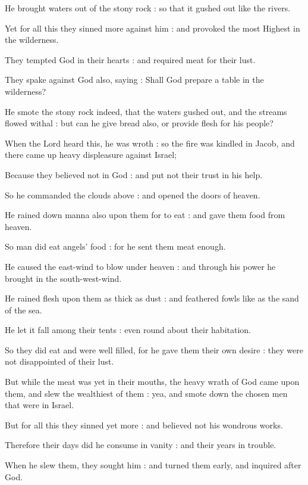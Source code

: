 He brought waters out of the stony rock : so that it gushed out like the rivers.\par
{}Yet for all this they sinned more against him : and provoked the most Highest in the wilderness.\par
{}They tempted God in their hearts : and required meat for their lust.\par
{}They spake against God also, saying : Shall God prepare a table in the wilderness?\par
{}He smote the stony rock indeed, that the waters gushed out, and the streams flowed withal : but can he give bread also, or provide flesh for his people?\par
{}When the Lord heard this, he was wroth : so the fire was kindled in Jacob, and there came up heavy displeasure against Israel;\par
{}Because they believed not in God : and put not their trust in his help.\par
{}So he commanded the clouds above : and opened the doors of heaven.\par
{}He rained down manna also upon them for to eat : and gave them food from heaven.\par
{}So man did eat angels' food : for he sent them meat enough.\par
{}He caused the east-wind to blow under heaven : and through his power he brought in the south-west-wind.\par
{}He rained flesh upon them as thick as dust : and feathered fowls like as the sand of the sea.\par
{}He let it fall among their tents : even round about their habitation.\par
{}So they did eat and were well filled, for he gave them their own desire : they were not disappointed of their lust.\par
{}But while the meat was yet in their mouths, the heavy wrath of God came upon them, and slew the wealthiest of them : yea, and smote down the chosen men that were in Israel.\par
{}But for all this they sinned yet more : and believed not his wondrous works.\par
{}Therefore their days did he consume in vanity : and their years in trouble.\par
{}When he slew them, they sought him : and turned them early, and inquired after God.\par
